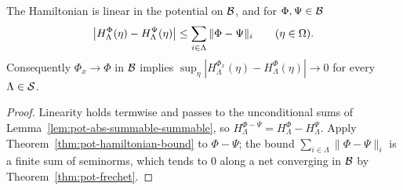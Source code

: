 \begin{lemma}
    \label{lem:pot-hamiltonian-uniform}
    \leanok

    The Hamiltonian is linear in the potential on $\mathcal{B}$, and for $\Phi, \Psi \in \mathcal{B}$
    \[ \bigl|H^\Phi_\Lambda(\eta) - H^\Psi_\Lambda(\eta)\bigr|
       \leq \sum_{i \in \Lambda} \|\Phi - \Psi\|_i \qquad (\eta \in \Omega) . \]
    Consequently $\Phi_x \to \Phi$ in $\mathcal{B}$ implies
    $\sup_\eta |H^{\Phi_x}_\Lambda(\eta) - H^{\Phi}_\Lambda(\eta)| \to 0$ for every
    $\Lambda \in \mathcal{S}$.
\end{lemma}
\begin{proof}
    \leanok

    Linearity holds termwise and passes to the unconditional sums of
    Lemma~\ref{lem:pot-abs-summable-summable}, so $H^{\Phi - \Psi}_\Lambda = H^\Phi_\Lambda -
    H^\Psi_\Lambda$. Apply Theorem~\ref{thm:pot-hamiltonian-bound} to $\Phi - \Psi$; the bound
    $\sum_{i \in \Lambda} \|\Phi - \Psi\|_i$ is a finite sum of seminorms, which tends to $0$
    along a net converging in $\mathcal{B}$ by Theorem~\ref{thm:pot-frechet}.
\end{proof}

